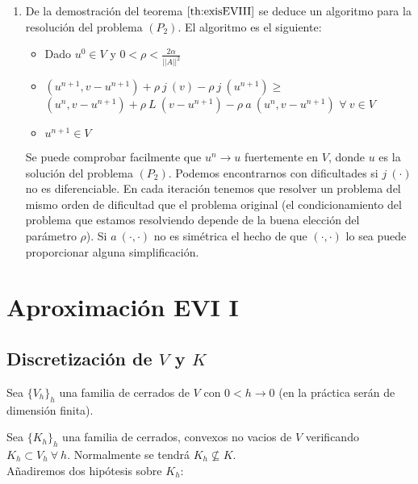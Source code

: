 \begin{enumerate}
\item De la demostraci\'on del teorema $\ref{th:exisEVIII}$ se deduce un
algoritmo para la \mbox{resoluci\'on} del problema $(P_2)$. El algoritmo es el
siguiente:

\begin{itemize}
\item Dado $u^0 \in V$ y $0<\rho < \frac{2\alpha }{||A||^2}$
\item $(u^{n+1},v-u^{n+1})+\rho \ j\ (v)-\rho \ j\ (u^{n+1}) \ge$ \newline
$(u^n,v-u^{n+1})+\rho \ L\ (v-u^{n+1})-\rho \ a\ (u^n,v-u^{n+1})$ $\forall
\ v \in V$
\item $u^{n+1} \in V$
\end{itemize}

Se puede comprobar facilmente que $u^n \to u$ fuertemente en $V$, donde $u$
es la soluci\'on del problema $(P_2)$. Podemos encontrarnos con dificultades
si $j\ (\cdot )$ no es diferenciable. En cada iteraci\'on tenemos que resolver
un problema del mismo orden de dificultad que el problema original (el
condicionamiento del problema que estamos resolviendo depende de la buena
elecci\'on del par\'ametro $\rho$). Si $a\ (\cdot ,\cdot )$ no es sim\'etrica
el hecho de que $(\cdot ,\cdot )$ lo sea puede proporcionar alguna
simplificaci\'on.

\end{enumerate}
\newpage
\section{Aproximaci\'on EVI I}

\subsection{Discretizaci\'on de $V$ y $K$}

Sea $\{ V_h\}_h$ una familia de cerrados de $V$ con $0<h \to 0$ (en la
pr\'actica ser\'an de dimensi\'on finita).\newline

Sea $\{ K_h\}_h$ una familia de cerrados, convexos no vacios de $V$ verificando
$K_h \subset V_h \ \forall \ h$. Normalmente se tendr\'a $K_h \nsubseteq K$.\\

A\~nadiremos dos hip\'otesis sobre $K_h$:

